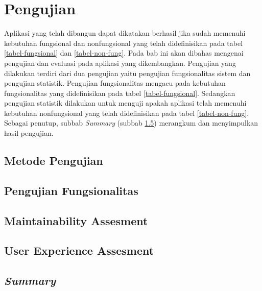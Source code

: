 \section{Pengujian}
	Aplikasi yang telah dibangun dapat dikatakan berhasil jika sudah memenuhi kebutuhan fungsional dan nonfungsional yang telah didefinisikan pada tabel \ref{tabel-fungsional} dan \ref{tabel-non-fung}. Pada bab ini akan dibahas mengenai pengujian dan evaluasi pada aplikasi yang dikembangkan. Pengujian yang dilakukan terdiri dari dua pengujian yaitu pengujian fungsionalitas sistem dan pengujian statistik. Pengujian fungsionalitas mengacu pada kebutuhan fungsionalitas yang didefinisikan pada tabel \ref{tabel-fungsional}. Sedangkan pengujian statistik dilakukan untuk menguji apakah aplikasi telah memenuhi kebutuhan nonfungsional yang telah didefinisikan pada tabel \ref{tabel-non-fung}. Sebagai penutup, subbab \textit{Summary} (subbab \ref{summary-pengujian}) merangkum dan menyimpulkan hasil pengujian.

	
	\subsection{Metode Pengujian}
	
		
	\subsection{Pengujian Fungsionalitas}
	
	
	\subsection{Maintainability Assesment}
	
	
	\subsection{User Experience Assesment}
	
	
	\subsection{\textit{Summary}}
	\label{summary-pengujian}
	
	
		
		
